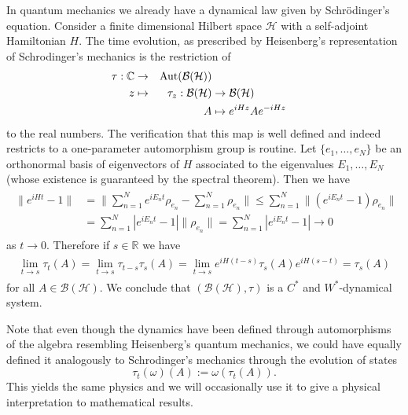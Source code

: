 \begin{example}\label{ex:schrodinger}
In quantum mechanics we already have a dynamical law given by Schrödinger's equation. Consider a finite dimensional Hilbert space $\mathcal{H}$ with a self-adjoint Hamiltonian $H$. The time evolution, as prescribed by Heisenberg's representation of Schrodinger's mechanics is the restriction of
\begin{alignat}{2}
\tau:\mathbb{C}&\rightarrow&\operatorname{Aut}(\mathcal{B}(\mathcal{H})) \nonumber \\
z&\mapsto&\tau_z:\mathcal{B}(\mathcal{H})&\rightarrow\mathcal{B}(\mathcal{H}) \\
&&A&\mapsto e^{iHz}Ae^{-iHz} \nonumber
\end{alignat}
to the real numbers. The verification that this map is well defined and indeed restricts to a one-parameter automorphism group is routine.
Let $\{e_1,\dots,e_N\}$ be an orthonormal basis of eigenvectors of $H$ associated to the eigenvalues $E_1,\dots,E_N$ (whose existence is guaranteed by the spectral theorem). Then we have
\begin{align}
\begin{split}
\|e^{iHt}-1\|&=\|\sum_{n=1}^Ne^{iE_nt}\rho_{e_n}-\sum_{n=1}^N \rho_{e_n}\|\leq\sum_{n=1}^N \|\left(e^{iE_nt}-1\right)\rho_{e_n}\| \\
&= \sum_{n=1}^N|e^{iE_nt}-1|\|\rho_{e_n}\|=\sum_{n=1}^N|e^{iE_nt}-1|\rightarrow 0
\end{split}
\end{align}
as $t\rightarrow 0$. Therefore if $s\in\mathbb{R}$ we have
\begin{align}
\begin{split}
\lim_{t\rightarrow s}\tau_t(A)=\lim_{t\rightarrow s}\tau_{t-s}\tau_s(A)=\lim_{t\rightarrow s}e^{iH(t-s)}\tau_s(A)e^{iH(s-t)}=\tau_s(A)
\end{split}
\end{align}
for all $A\in \mathcal{B}(\mathcal{H})$. We conclude that $(\mathcal{B}(\mathcal{H}),\tau)$ is a $C^*$ and $W^*$-dynamical system.
\end{example} 

Note that even though the dynamics have been defined through automorphisms of the algebra resembling Heisenberg's quantum mechanics, we could have equally defined it analogously to Schrodinger's mechanics through the evolution of states
\begin{equation}
\tau_t(\omega)(A):=\omega(\tau_t(A)).
\end{equation}
This yields the same physics and we will occasionally use it to give a physical interpretation to mathematical results. 

